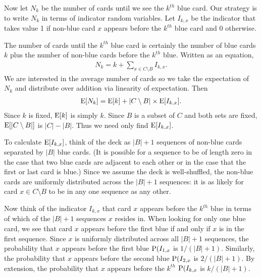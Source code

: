 Now let $N_k$ be the number of cards until
we see the $k^{th}$ blue card.
Our strategy is to write $N_k$ in terms of
indicator random variables.
Let $I_{k,x}$ be the indicator that takes value 1
if non-blue card $x$ appears before the $k^{th}$ blue card
and 0 otherwise.

The number of cards until the $k^{th}$ blue card
is certainly the number of blue cards $k$
plus the number of non-blue cards before the $k^{th}$ blue.
Written as an equation,
\begin{align}
    N_k = k + \sum_{x \in C \setminus B} I_{k,x}. \nonumber
\end{align}
We are interested in the average number of cards
so we take the expectation of $N_k$ and distribute
over addition via linearity of expectation.
Then
\begin{align} \label{eq:expected_card}
    \operatorname{\mathrm{E}}[N_k] = \operatorname{\mathrm{E}}[k] + |C \setminus B| \times \operatorname{\mathrm{E}}[I_{k,x}].
\end{align}
Since $k$ is fixed, $\operatorname{\mathrm{E}}[k]$ is simply $k$.
Since $B$ is a subset of $C$ and both sets are fixed,
$\operatorname{\mathrm{E}}[|C \setminus B|]$ is $|C| - |B|$.
Thus we need only find $\operatorname{\mathrm{E}}[I_{k,x}]$.

To calculate $\operatorname{\mathrm{E}}[I_{k,x}]$, think of the deck as $|B| + 1$ sequences 
of non-blue cards separated by $|B|$ blue cards.
(It is possible for a sequence to be of length zero
in the case that two blue cards are adjacent to each other or
in the case that the first or last card is blue.)
Since we assume the deck is well-shuffled, the non-blue cards
are uniformly distributed across the $|B| + 1$ sequences:
it is as likely for card $x \in C \setminus B$ to be in any one sequence
as any other.

Now think of the indicator $I_{k,x}$ that card $x$ appears
before the $k^{th}$ blue in terms of which of the $|B| + 1$
sequences $x$ resides in.
When looking for only one blue card,
we see that card $x$ appears before the first blue if and only if
$x$ is in the first sequence.
Since $x$ is uniformly distributed across all $|B| + 1$ sequences,
the probability that $x$ appears before the first blue $\operatorname{\mathrm{P}}(I_{1,x}$
is $1/(|B| + 1)$.
Similarly, the probability that $x$ appears before the second blue
$\operatorname{\mathrm{P}}(I_{2,x}$ is $2/(|B| + 1)$.
By extension, the probability that $x$ appears before the $k^{th}$
$\operatorname{\mathrm{P}}(I_{k,x}$ is $k/(|B| + 1)$.

